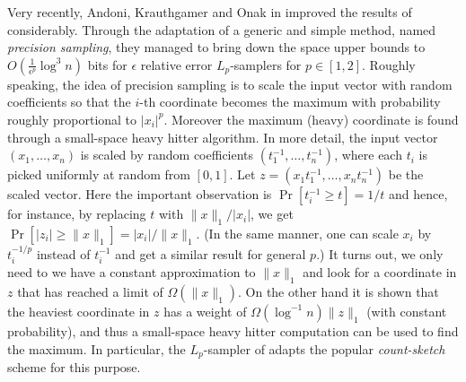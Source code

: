   Very recently, Andoni, Krauthgamer and Onak in %
\cite{AndoniKO10} improved the results of \cite{MonemizadehW10} 
 considerably. Through the adaptation of %
  a generic and simple method, named {\it precision sampling}, they managed
   to bring down the space upper bounds to $O(\frac1{\epsilon^p}\log^3 n)$ bits
   for $\epsilon$ relative error $L_p$-samplers for $p \in [1,2]$. Roughly speaking, the idea of precision
  sampling is to scale the input vector with random coefficients so that the $i$-th coordinate
  becomes the maximum with probability roughly proportional to $|x_i|^p$. Moreover the maximum (heavy)
   coordinate is found through a small-space heavy hitter algorithm. In more detail,
    the input vector $(x_1,\ldots,x_n)$ is scaled 
   by random coefficients $(t_1^{-1},\ldots,t_n^{-1})$, where each $t_i$ is picked uniformly 
   at random from $[0,1]$. Let $z=(x_1t_1^{-1},\ldots,x_nt_n^{-1})$ be the 
   scaled vector. %
 Here the 
   important observation is $\Pr[t_i^{-1} \ge t] =1/t$ 
   and hence, for instance,  by replacing $t$ with 
   $\|x\|_1/|x_i|$, we get $\Pr[|z_i| \ge \|x\|_1] = |x_i|/\|x\|_1$. (In the
   same manner, one can scale $x_i$ by $t_i^{-1/p}$
   instead of $t_i^{-1}$ and get a similar result for general $p$.) %
It turns out, we only need to we have a constant approximation to
$\|x\|_1$ and look for a coordinate in $z$ that has reached a
   limit of $\Omega(\|x\|_1)$. On the other hand it is shown that the heaviest coordinate in $z$ has
   a weight of $\Omega(\log^{-1}{n})\|z\|_1$ (with constant probability), and thus
   a small-space heavy hitter computation can be used to find the maximum. In particular, 
   the $L_p$-sampler of \cite{AndoniKO10} adapts the
   popular {\it count-sketch} scheme \cite{CharikarCF04} for this purpose.
